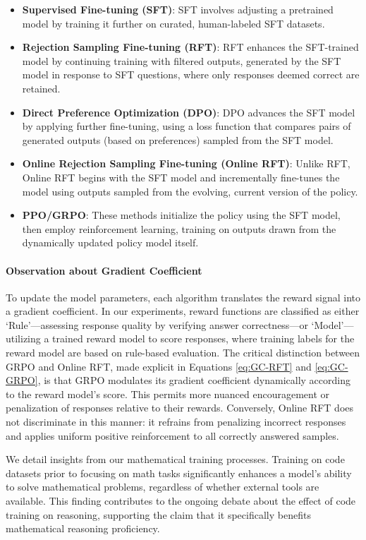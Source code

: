 \begin{itemize}
    \item \textbf{Supervised Fine-tuning (SFT)}: SFT involves adjusting a pretrained model by training it further on curated, human-labeled SFT datasets.
    \item \textbf{Rejection Sampling Fine-tuning (RFT)}: RFT enhances the SFT-trained model by continuing training with filtered outputs, generated by the SFT model in response to SFT questions, where only responses deemed correct are retained.
    \item \textbf{Direct Preference Optimization (DPO)}: DPO advances the SFT model by applying further fine-tuning, using a loss function that compares pairs of generated outputs (based on preferences) sampled from the SFT model.
    \item \textbf{Online Rejection Sampling Fine-tuning (Online RFT)}: Unlike RFT, Online RFT begins with the SFT model and incrementally fine-tunes the model using outputs sampled from the evolving, current version of the policy.
    \item \textbf{PPO/GRPO}: These methods initialize the policy using the SFT model, then employ reinforcement learning, training on outputs drawn from the dynamically updated policy model itself.
\end{itemize}

\paragraph{Observation about Gradient Coefficient} To update the model parameters, each algorithm translates the reward signal into a gradient coefficient. In our experiments, reward functions are classified as either ‘Rule’—assessing response quality by verifying answer correctness—or ‘Model’—utilizing a trained reward model to score responses, where training labels for the reward model are based on rule-based evaluation. The critical distinction between GRPO and Online RFT, made explicit in Equations \ref{eq:GC-RFT} and \ref{eq:GC-GRPO}, is that GRPO modulates its gradient coefficient dynamically according to the reward model’s score. This permits more nuanced encouragement or penalization of responses relative to their rewards. Conversely, Online RFT does not discriminate in this manner: it refrains from penalizing incorrect responses and applies uniform positive reinforcement to all correctly answered samples.

    \item We detail insights from our mathematical training processes. Training on code datasets prior to focusing on math tasks significantly enhances a model's ability to solve mathematical problems, regardless of whether external tools are available. This finding contributes to the ongoing debate about the effect of code training on reasoning, supporting the claim that it specifically benefits mathematical reasoning proficiency.

